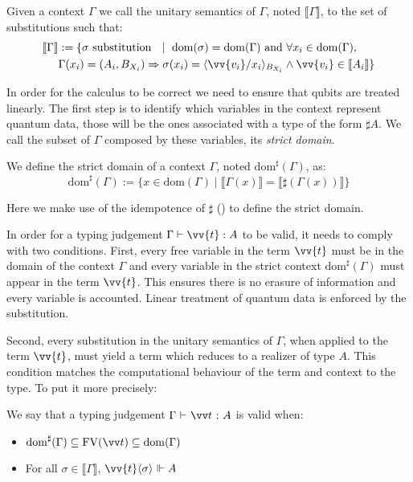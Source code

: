 \documentclass[runningheads,orivec,envcountsame,envcountsect]{llncs}
\newcommand\ansubst[2]{\ensuremath{\langle #1 \rangle_{#2}}}
\newcommand\dom[1]{\mathrm{dom}(#1)}
\newcommand\sdom[1]{\mathrm{dom}^{\sharp}(#1)}
\newcommand\FV[1]{\mathrm{FV}(#1)}
\def\sem#1{\llbracket#1\rrbracket}
\def\TYP#1#2#3{#1~{\vdash}~#2~{:}~#3}
\def\real{\Vdash}
\newcommand\basis[1]{\ensuremath{B_{ #1 }}}
\begin{document}
\begin{definition}
    Given a context $\Gamma$ we call the unitary semantics of $\Gamma$, noted $\sem{\Gamma}$, to the set of substitutions such that:
    \begin{align*}
      \sem{\Gamma} &:= 
      \{\sigma\text{ substitution }~\mid~ \dom{\sigma} = \dom{\Gamma}\text{ and } \forall {x_i} \in\dom{\Gamma},\\
      &\Gamma(x_i) = (A_i, \basis{X_i})\Rightarrow \sigma(x_i)=\ansubst{\vv{v_i}/x_i}{\basis{X_i}} \land \vv{v_i}\in\sem{A_i}\}
    \end{align*}
\end{definition}

In order for the calculus to be correct we need to ensure that qubits are treated linearly. The first step is to identify which variables in the context represent quantum data, those will be the ones associated with a type of the form $\sharp A$. We call the subset of $\Gamma$ composed by these variables, its \emph{strict domain}. 

\begin{definition}
    We define the strict domain of a context $\Gamma$, noted $\sdom{\Gamma}$, as:
    \[
    \sdom{\Gamma} := \{x\in\dom{\Gamma} \mid \sem{\Gamma(x)}=\sem{\sharp(\Gamma(x))}\}
    \]
\end{definition}

Here we make use of the idempotence of $\sharp$ () to define the strict domain. 

In order for a typing judgement $\Gamma\vdash \vv{t}: A$ to be valid, it needs to comply with two conditions. First, every free variable in the term $\vv{t}$ must be in the domain of the context $\Gamma$ and every variable in the strict context $\sdom{\Gamma}$ must appear in the term $\vv{t}$. This ensures there is no erasure of information and every variable is accounted. Linear treatment of quantum data is enforced by the substitution.

Second, every substitution in the unitary semantics of $\Gamma$, when applied to the term $\vv{t}$, must yield a term which reduces to a realizer of type $A$. This condition matches the computational behaviour of the term and context to the type. To put it more precisely: 

\begin{definition}
    We say that a typing judgement $\TYP{\Gamma}{\vv t}{A}$ is valid when:
    \begin{itemize}
        \item $\sdom{\Gamma}\subseteq\FV{\vv t}\subseteq \dom{\Gamma}$
        \item For all $\sigma\in\sem\Gamma$, $\vv{t}\ansubst{\sigma}{}\real A$
    \end{itemize}
\end{definition}
\end{document}
